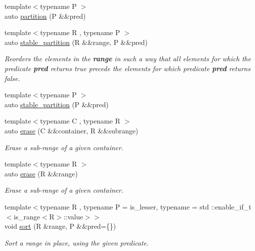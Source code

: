 \begin{DoxyCompactItemize}
{\footnotesize template$<$typename P $>$ }\\auto \mbox{\hyperlink{namespacerah_afeced5adb7a17c0c8f34b64559ddc60c}{partition}} (P \&\&pred)
\item 
{\footnotesize template$<$typename R , typename P $>$ }\\auto \mbox{\hyperlink{namespacerah_ac184b21a98515705f9b4845875fb689b}{stable\+\_\+partition}} (R \&\&range, P \&\&pred)
\begin{DoxyCompactList}\small\item\em Reorders the elements in the {\bfseries{range}} in such a way that all elements for which the predicate {\bfseries{pred}} returns {\ttfamily true} precede the elements for which predicate {\bfseries{pred}} returns false. \end{DoxyCompactList}\item 
{\footnotesize template$<$typename P $>$ }\\auto \mbox{\hyperlink{namespacerah_ae51c8e542493089f60675db2d0018329}{stable\+\_\+partition}} (P \&\&pred)
\item 
{\footnotesize template$<$typename C , typename R $>$ }\\auto \mbox{\hyperlink{namespacerah_a3b055c0e04f784b9abc89a27ef4534dd}{erase}} (C \&\&container, R \&\&subrange)
\begin{DoxyCompactList}\small\item\em Erase a sub-\/range of a given container. \end{DoxyCompactList}\item 
{\footnotesize template$<$typename R $>$ }\\auto \mbox{\hyperlink{namespacerah_a80ea7a94642c23e9f3db6f6b890f2987}{erase}} (R \&\&range)
\begin{DoxyCompactList}\small\item\em Erase a sub-\/range of a given container. \end{DoxyCompactList}\item 
{\footnotesize template$<$typename R , typename P  = is\+\_\+lesser, typename  = std \+::enable\+\_\+if\+\_\+t$<$is\+\_\+range$<$\+R$>$\+::value$>$$>$ }\\void \mbox{\hyperlink{namespacerah_a02bc4f7618438272f7ec9f3c819d5990}{sort}} (R \&range, P \&\&pred=\{\})
\begin{DoxyCompactList}\small\item\em Sort a range in place, using the given predicate. \end{DoxyCompactList}\item 

\end{DoxyCompactItemize}
